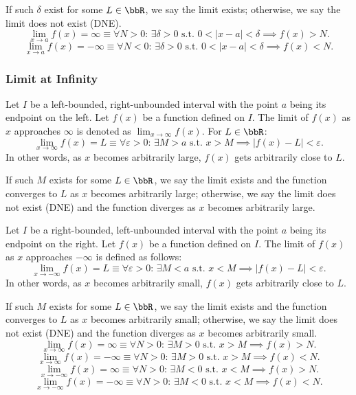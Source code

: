 \documentclass[a4paper,12pt]{report}
\begin{document}
If such $\delta$ exist for some $L\in\bbR$, we say the limit exists; otherwise, we say the limit does not exist (DNE).
\[\lim_{x\to a}f(x)=\infty \equiv \forall N > 0:\, \exists \delta > 0 \text{\ s.t.\ } 0 < |x - a| < \delta \implies f(x) > N.\]
\[\lim_{x\to a}f(x)=-\infty \equiv \forall N < 0:\, \exists \delta > 0 \text{\ s.t.\ } 0 < |x - a| < \delta \implies f(x) < N.\]
\subsubsection{Limit at Infinity}
Let \(I\) be a left-bounded, right-unbounded interval with the point \(a\) being its endpoint on the left. Let \( f(x) \) be a function defined on \(I\). The limit of \( f(x) \) as \( x \) approaches \( \infty \) is denoted as $\lim_{x \to \infty} f(x)$. For $L\in\bbR$:
\[\lim_{x \to \infty} f(x) = L \equiv \forall \varepsilon > 0: \, \exists M > a \text{\ s.t.\ } x > M \implies |f(x) - L| < \varepsilon.\]
In other words, as \(x\) becomes arbitrarily large, \(f(x)\) gets arbitrarily close to \(L\).

If such $M$ exists for some $L\in\bbR$, we say the limit exists and the function converges to $L$ as \(x\) becomes arbitrarily large; otherwise, we say the limit does not exist (DNE) and the function diverges as \(x\) becomes arbitrarily large.

Let \(I\) be a right-bounded, left-unbounded interval with the point \(a\) being its endpoint on the right. Let \( f(x) \) be a function defined on \(I\). The limit of \( f(x) \) as \( x \) approaches \( -\infty \) is defined as follows:
\[\lim_{x \to -\infty} f(x) = L \equiv \forall \varepsilon > 0: \, \exists M < a \text{\ s.t.\ } x < M \implies |f(x) - L| < \varepsilon.\]
In other words, as \(x\) becomes arbitrarily small, \(f(x)\) gets arbitrarily close to \(L\).

If such $M$ exists for some $L\in\bbR$, we say the limit exists and the function converges to $L$ as \(x\) becomes arbitrarily small; otherwise, we say the limit does not exist (DNE) and the function diverges as \(x\) becomes arbitrarily small.
\[\lim_{x\to\infty}f(x)=\infty \equiv \forall N > 0:\, \exists M > 0 \text{\ s.t.\ } x > M \implies f(x) > N.\]
\[\lim_{x\to\infty}f(x)=-\infty \equiv \forall N > 0:\, \exists M > 0 \text{\ s.t.\ } x > M \implies f(x) < N.\]
\[\lim_{x\to-\infty}f(x)=\infty \equiv \forall N > 0:\, \exists M < 0 \text{\ s.t.\ } x < M \implies f(x) > N.\]
\[\lim_{x\to-\infty}f(x)=-\infty \equiv \forall N > 0:\, \exists M < 0 \text{\ s.t.\ } x < M \implies f(x) < N.\]
\end{document}
